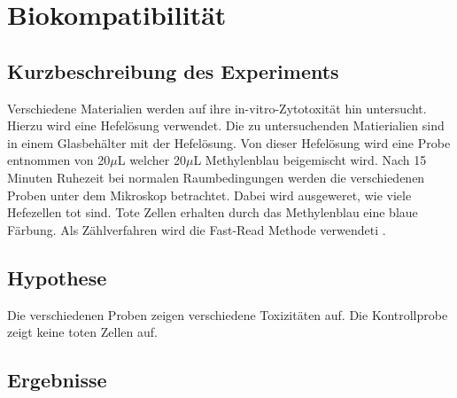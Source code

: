 \section{Biokompatibilität}

\subsection{Kurzbeschreibung des Experiments}
Verschiedene Materialien werden auf ihre in-vitro-Zytotoxität hin untersucht.
Hierzu wird eine Hefelösung verwendet. Die zu untersuchenden Matierialien
sind in einem Glasbehälter mit der Hefelösung. Von dieser Hefelösung wird eine
Probe entnommen von 20$\mu$L welcher 20$\mu$L Methylenblau beigemischt wird.
Nach 15 Minuten Ruhezeit bei normalen Raumbedingungen werden die verschiedenen
Proben unter dem Mikroskop betrachtet. Dabei wird ausgeweret, wie viele
Hefezellen tot sind. Tote Zellen erhalten durch das Methylenblau eine blaue
Färbung. Als Zählverfahren wird die Fast-Read Methode verwendeti \cite{fast}.

\subsection{Hypothese}
Die verschiedenen Proben zeigen verschiedene Toxizitäten auf. Die
Kontrollprobe zeigt keine toten Zellen auf.

\newpage
\subsection{Ergebnisse}

